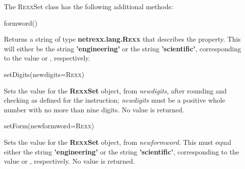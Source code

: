 The R\textsc{exx}Set class has the following additional methods:
\begin{description}
\item{formword()}

Returns a string of type \textbf{netrexx.lang.R\textsc{exx}} that describes the
 property.  This will either be the string \textbf{'engineering'}
or the string \textbf{'scientific'}, corresponding to the 
value  or , respectively.
\item{setDigits(newdigits=R\textsc{exx})}

Sets the  value for the \textbf{R\textsc{exx}Set} object, from
\emph{newdigits}, after rounding and checking as defined for the
 instruction; \emph{newdigits} must be a positive
whole number with no more than nine digits.
No value is returned.
\item{setForm(newformword=R\textsc{exx})}

Sets the  value for the \textbf{R\textsc{exx}Set} object, from
\emph{newformword}.
This must equal either the string \textbf{'engineering'} or the
string \textbf{'scientific'}, corresponding to the 
value  or , respectively.
No value is returned.
\end{description}
